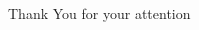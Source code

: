 \STANDARD{}
{
  \begin{columns}
    \begin{column}{0.35\textwidth}
      \begin{block}{~~~~~~Thank You}
        \centering
        for your attention
      \end{block}
    \end{column}
  \end{columns}
}

